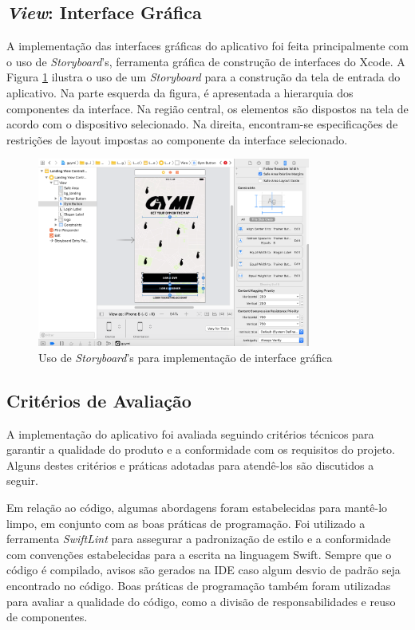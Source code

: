 \subsection{\textit{View}: Interface Gráfica}
A implementação das interfaces gráficas do aplicativo foi feita principalmente com o uso de \textit{Storyboard}'s, ferramenta gráfica de construção de interfaces do Xcode. A Figura \ref{fig:storyboard} ilustra o uso de um \textit{Storyboard} para a construção da tela de entrada do aplicativo. Na parte esquerda da figura, é apresentada a hierarquia dos componentes da interface. Na região central, os elementos são dispostos na tela de acordo com o dispositivo selecionado. Na direita, encontram-se especificações de restrições de layout impostas ao componente da interface selecionado.

\begin{figure}[H]
    \centering
    \includegraphics[width=0.8\textwidth]{pfc/figuras/storyboard.png}
    \caption{Uso de \textit{Storyboard}'s para implementação de interface gráfica}
    \label{fig:storyboard}
\end{figure}

\subsection{Critérios de Avaliação}
A implementação do aplicativo foi avaliada seguindo critérios técnicos para garantir a qualidade do produto e a conformidade com os requisitos do projeto. Alguns destes critérios e práticas adotadas para atendê-los são discutidos a seguir.

Em relação ao código, algumas abordagens foram estabelecidas para mantê-lo limpo, em conjunto com as boas práticas de programação. Foi utilizado a ferramenta \textit{SwiftLint} \cite{swift-lint} para assegurar a padronização de estilo e a conformidade com convenções estabelecidas para a escrita na linguagem Swift. Sempre que o código é compilado, avisos são gerados na IDE caso algum desvio de padrão seja encontrado no código. Boas práticas de programação também foram utilizadas para avaliar a qualidade do código, como a divisão de responsabilidades e reuso de componentes.

